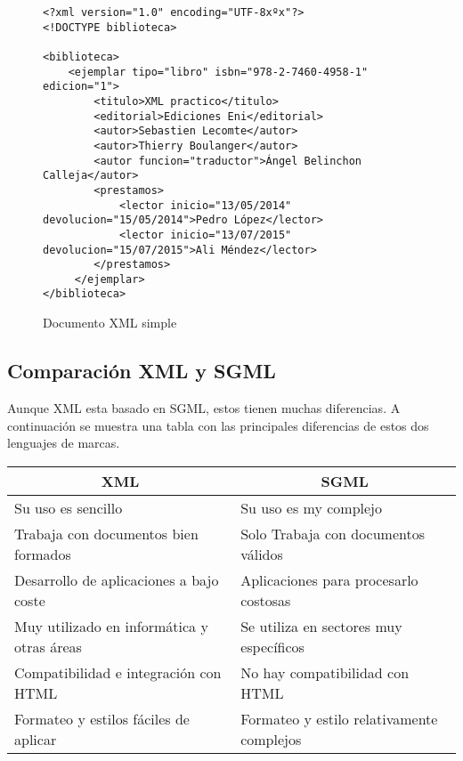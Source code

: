 \begin{figure}[h]
    \begin{tcolorbox}[sharp corners, colback=yellow!30, colframe=white!20]
      \scriptsize
      \begin{verbatim}
<?xml version="1.0" encoding="UTF-8xºx"?>
<!DOCTYPE biblioteca>

<biblioteca>
    <ejemplar tipo="libro" isbn="978-2-7460-4958-1" edicion="1">
        <titulo>XML practico</titulo>
        <editorial>Ediciones Eni</editorial>
        <autor>Sebastien Lecomte</autor>
        <autor>Thierry Boulanger</autor>
        <autor funcion="traductor">Ángel Belinchon Calleja</autor>
        <prestamos>
            <lector inicio="13/05/2014" devolucion="15/05/2014">Pedro López</lector>
            <lector inicio="13/07/2015" devolucion="15/07/2015">Ali Méndez</lector>
        </prestamos>
     </ejemplar>
</biblioteca>
      \end{verbatim}
    \end{tcolorbox}
    \caption{Documento XML simple}
\end{figure}

\subsection{Comparación XML y SGML}
Aunque XML esta basado en SGML, estos tienen muchas diferencias. A continuación se muestra una tabla con las principales diferencias de estos dos lenguajes de marcas.

 \begin{table}[h]
     \centering
    {\renewcommand{\arraystretch}{1.5}
        \begin{tabular}[c]{ |l|l| }
            \hline
            \multicolumn{1}{|c|}{\textbf{XML}} & \multicolumn{1}{|c|}{\textbf{SGML}} \\ \hline
            Su uso es sencillo & Su uso es my complejo \\ \hline
            Trabaja con documentos bien formados & Solo Trabaja con documentos válidos \\ \hline
            Desarrollo de aplicaciones a bajo coste & Aplicaciones para procesarlo costosas \\ \hline
            Muy utilizado en informática y otras áreas & Se utiliza en sectores muy específicos\\ \hline
            Compatibilidad e integración con HTML & No hay compatibilidad con HTML \\ \hline
            Formateo y estilos fáciles de aplicar & Formateo y estilo relativamente complejos \\ \hline
    \end{tabular}}
 \end{table}

